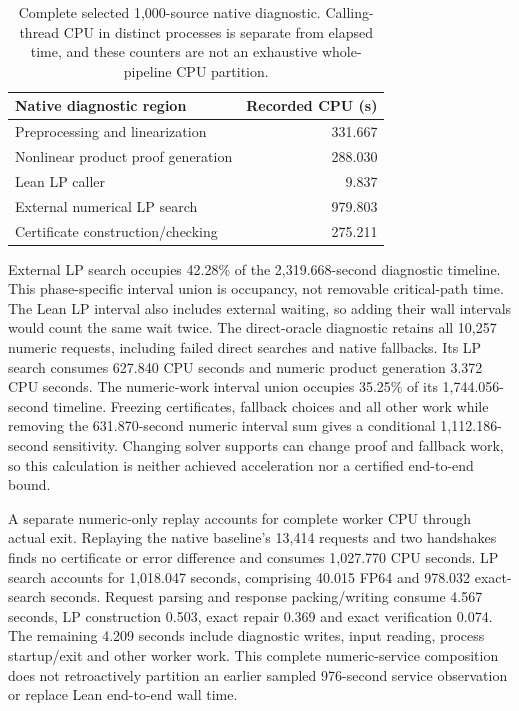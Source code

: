 \documentclass[10pt,twocolumn]{article}
\begin{document}
\begin{table}[t]
\centering
\small
\begin{tabular}{@{}lr@{}}
\toprule
Native diagnostic region & Recorded CPU (s) \\
\midrule
Preprocessing and linearization & 331.667 \\
Nonlinear product proof generation & 288.030 \\
Lean LP caller & 9.837 \\
External numerical LP search & 979.803 \\
Certificate construction/checking & 275.211 \\
\bottomrule
\end{tabular}
\caption{Complete selected 1,000-source native diagnostic.
Calling-thread CPU in distinct processes is separate from elapsed time,
and these counters are not an exhaustive whole-pipeline CPU partition.}
\label{tab:arithmetic-complete-phases}
\end{table}

External LP search occupies 42.28\% of the 2,319.668-second diagnostic timeline.
This phase-specific interval union is occupancy, not removable critical-path
time. The Lean LP interval also includes external waiting, so adding their
wall intervals would count the same wait twice.
The direct-oracle diagnostic retains all 10,257 numeric requests, including
failed direct searches and native fallbacks. Its LP search consumes 627.840 CPU
seconds and numeric product generation 3.372 CPU seconds.
The numeric-work interval union occupies 35.25\% of its 1,744.056-second
timeline. Freezing certificates, fallback choices and all other work while
removing the 631.870-second numeric interval sum gives a conditional
1,112.186-second sensitivity. Changing solver supports can change proof and
fallback work, so this calculation is neither achieved acceleration nor a
certified end-to-end bound.

A separate numeric-only replay accounts for complete worker CPU through
actual exit. Replaying the native baseline's 13,414 requests and two
handshakes finds no certificate or error difference and consumes
1,027.770 CPU seconds. LP search accounts for 1,018.047 seconds, comprising
40.015 FP64 and 978.032 exact-search seconds.
Request parsing and response packing/writing consume 4.567 seconds, LP
construction 0.503, exact repair 0.369 and exact verification 0.074.
The remaining 4.209 seconds include diagnostic writes, input reading, process
startup/exit and other worker work. This complete numeric-service composition
does not retroactively partition an earlier sampled 976-second service
observation or replace Lean end-to-end wall time.
\end{document}
